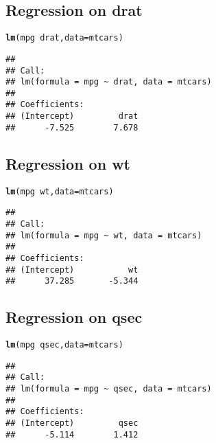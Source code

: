 \documentclass{article}\usepackage[]{graphicx}\usepackage[]{color}
\makeatletter
\newcommand{\hlopt}[1]{\textcolor[rgb]{0,0,0}{#1}}%
\newcommand{\hlstd}[1]{\textcolor[rgb]{0.345,0.345,0.345}{#1}}%
\newcommand{\hlkwc}[1]{\textcolor[rgb]{0.333,0.667,0.333}{#1}}%
\newcommand{\hlkwd}[1]{\textcolor[rgb]{0.737,0.353,0.396}{\textbf{#1}}}%
\newenvironment{kframe}{%
 \def\at@end@of@kframe{}%
 \ifinner\ifhmode%
  \def\at@end@of@kframe{\end{minipage}}%
  \begin{minipage}{\columnwidth}%
 \fi\fi%
 \def\FrameCommand##1{\hskip\@totalleftmargin \hskip-\fboxsep
 \colorbox{shadecolor}{##1}\hskip-\fboxsep
     \hskip-\linewidth \hskip-\@totalleftmargin \hskip\columnwidth}%
 \MakeFramed {\advance\hsize-\width
   \@totalleftmargin\z@ \linewidth\hsize
   \@setminipage}}%
 {\par\unskip\endMakeFramed%
 \at@end@of@kframe}
\newenvironment{knitrout}{}{} %
\makeatother
\begin{document}
\subsection{Regression on drat}
\begin{knitrout}
\color{fgcolor}\begin{kframe}
\begin{alltt}
\hlkwd{lm}\hlstd{(mpg}\hlopt{~}\hlstd{drat,} \hlkwc{data}\hlstd{=mtcars)}
\end{alltt}
\begin{verbatim}
## 
## Call:
## lm(formula = mpg ~ drat, data = mtcars)
## 
## Coefficients:
## (Intercept)         drat  
##      -7.525        7.678
\end{verbatim}
\end{kframe}
\end{knitrout}
\subsection{Regression on wt}
\begin{knitrout}
\color{fgcolor}\begin{kframe}
\begin{alltt}
\hlkwd{lm}\hlstd{(mpg}\hlopt{~}\hlstd{wt,} \hlkwc{data}\hlstd{=mtcars)}
\end{alltt}
\begin{verbatim}
## 
## Call:
## lm(formula = mpg ~ wt, data = mtcars)
## 
## Coefficients:
## (Intercept)           wt  
##      37.285       -5.344
\end{verbatim}
\end{kframe}
\end{knitrout}
\subsection{Regression on qsec}
\begin{knitrout}
\color{fgcolor}\begin{kframe}
\begin{alltt}
\hlkwd{lm}\hlstd{(mpg}\hlopt{~}\hlstd{qsec,} \hlkwc{data}\hlstd{=mtcars)}
\end{alltt}
\begin{verbatim}
## 
## Call:
## lm(formula = mpg ~ qsec, data = mtcars)
## 
## Coefficients:
## (Intercept)         qsec  
##      -5.114        1.412
\end{verbatim}
\end{kframe}
\end{knitrout}
\end{document}
